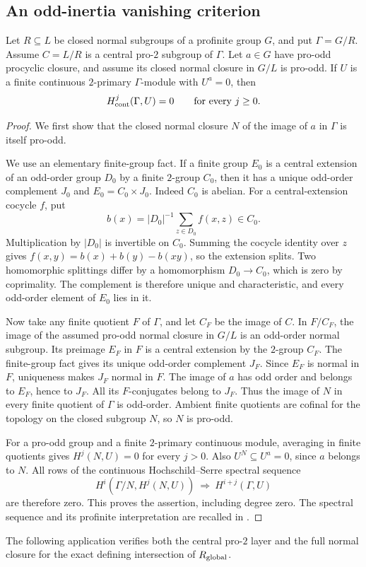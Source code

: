 \subsection{An odd-inertia vanishing criterion}
\label{sec:odd-inertia-criterion}

\begin{proposition}\label{prop:odd-inertia-vanishing}
Let \(R\subseteq L\) be closed normal subgroups of a profinite group
\(G\), and put \(\Gamma=G/R\).
Assume \(C=L/R\) is a central pro-\(2\) subgroup of \(\Gamma\).
Let \(a\in G\) have pro-odd procyclic closure, and assume its closed
normal closure in \(G/L\) is pro-odd.
If \(U\) is a finite continuous \(2\)-primary \(\Gamma\)-module with
\(U^a=0\), then
\[
 H^j_{\rm cont}(\Gamma,U)=0\qquad\text{for every }j\ge0.
\]
\end{proposition}

\begin{proof}
We first show that the closed normal closure \(N\) of the image of
\(a\) in \(\Gamma\) is itself pro-odd.

We use an elementary finite-group fact.
If a finite group \(E_0\) is a central extension of an odd-order group
\(D_0\) by a finite \(2\)-group \(C_0\), then it has a unique odd-order
complement \(J_0\) and \(E_0=C_0\times J_0\).
Indeed \(C_0\) is abelian.  For a central-extension cocycle \(f\),
put
\[
 b(x)=|D_0|^{-1}\sum_{z\in D_0}f(x,z)\in C_0.
\]
Multiplication by \(|D_0|\) is invertible on \(C_0\).
Summing the cocycle identity over \(z\) gives
\(f(x,y)=b(x)+b(y)-b(xy)\), so the extension splits.
Two homomorphic splittings differ by a homomorphism \(D_0\to C_0\),
which is zero by coprimality.
The complement is therefore unique and characteristic, and every
odd-order element of \(E_0\) lies in it.

Now take any finite quotient \(F\) of \(\Gamma\), and let \(C_F\)
be the image of \(C\).  In \(F/C_F\), the image of the assumed
pro-odd normal closure in \(G/L\) is an odd-order normal subgroup.
Its preimage \(E_F\) in \(F\) is a central extension by the \(2\)-group
\(C_F\).  The finite-group fact gives its unique odd-order complement
\(J_F\).  Since \(E_F\) is normal in \(F\), uniqueness makes \(J_F\)
normal in \(F\).
The image of \(a\) has odd order and belongs to \(E_F\), hence to
\(J_F\).  All its \(F\)-conjugates belong to \(J_F\).
Thus the image of \(N\) in every finite quotient of \(\Gamma\) is
odd-order.  Ambient finite quotients are cofinal for the topology
on the closed subgroup \(N\), so \(N\) is pro-odd.

For a pro-odd group and a finite \(2\)-primary continuous module,
averaging in finite quotients gives
\(H^j(N,U)=0\) for every \(j>0\).
Also \(U^N\subseteq U^a=0\), since \(a\) belongs to \(N\).
All rows of the continuous Hochschild--Serre spectral sequence
\[
 H^i(\Gamma/N,H^j(N,U))
       \ \Longrightarrow\ H^{i+j}(\Gamma,U)
\]
are therefore zero.  This proves the assertion, including degree zero.
The spectral sequence and its profinite interpretation are recalled in
\cite[II, Remark~1.35(b), p.~72; Proposition~4.2, p.~87]{MilneCFT}.
\end{proof}

The following application verifies both the central pro-\(2\) layer
and the full normal closure for the exact defining intersection of
\(R_{\rm global}\).
